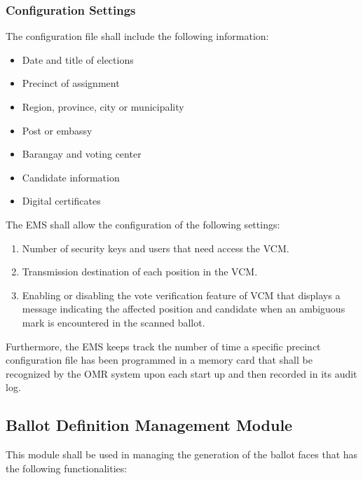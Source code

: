 \documentclass[a4paper, 11pt]{article}
\begin{document}
\subsubsection{Configuration Settings}
The configuration file shall include the following information:
\begin{itemize}
	\item Date and title of elections
	\item Precinct of assignment
	\item Region, province, city or municipality
	\item Post or embassy
	\item Barangay and voting center
	\item Candidate information
	\item Digital certificates
\end{itemize}
The EMS shall allow the configuration of the following settings:
\begin{enumerate}
	\item Number of security keys and users that need access the VCM.
	\item Transmission destination of each position in the VCM.
	\item Enabling or disabling the vote verification feature of VCM that displays a message indicating the affected position and candidate when an ambiguous mark is encountered in the scanned ballot.
\end{enumerate}
Furthermore, the EMS keeps track the number of time a specific precinct configuration file has been programmed in a memory card that shall be recognized by the OMR system upon each start up and then recorded in its audit log.


\subsection{Ballot Definition Management Module}
This module shall be used in managing the generation of the ballot faces that has the following functionalities:
\end{document}
